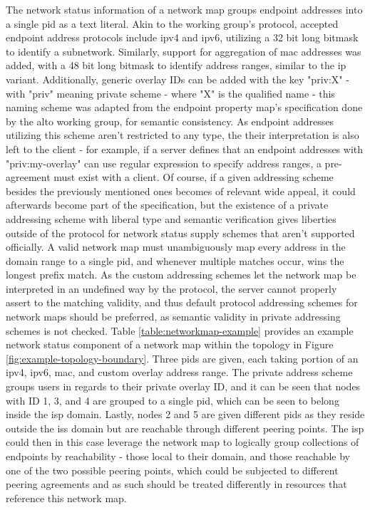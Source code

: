    The network status information of a network map groups endpoint addresses into a single \gls{pid} as a text literal.
    Akin to the working group's protocol, accepted endpoint address protocols include \gls{ipv4} and \gls{ipv6}, utilizing a 32 bit long bitmask to identify a subnetwork.
    Similarly, support for aggregation of \gls{mac} addresses was added, with a 48 bit long bitmask to identify address ranges, similar to the \gls{ip} variant.
    Additionally, generic overlay IDs can be added with the key "priv:X" - with "priv" meaning private scheme - where "X" is the qualified name - this naming scheme was adapted from the endpoint property map's specification done by the \gls{alto} working group, for semantic consistency.
    As endpoint addresses utilizing this scheme aren't restricted to any type, the their interpretation is also left to the client - for example, if a server defines that an endpoint addresses with "priv:my-overlay" can use regular expression to specify address ranges, a pre-agreement must exist with a client.
    Of course, if a given addressing scheme besides the previously mentioned ones becomes of relevant wide appeal, it could afterwards become part of the specification, but the existence of a private addressing scheme with liberal type and semantic verification gives liberties outside of the protocol for network status supply schemes that aren't supported officially.
    A valid network map must unambiguously map every address in the domain range to a single \gls{pid}, and whenever multiple matches occur, wins the longest prefix match.
    As the custom addressing schemes let the network map be interpreted in an undefined way by the protocol, the server cannot properly assert to the matching validity, and thus default protocol addressing schemes for network maps should be preferred, as semantic validity in private addressing schemes is not checked.
    Table \ref{table:networkmap-example} provides an example network status component of a network map within the topology in Figure \ref{fig:example-topology-boundary}.
    Three \glspl{pid} are given, each taking portion of an \gls{ipv4}, \gls{ipv6}, \gls{mac}, and custom overlay address range.
    The private address scheme groups users in regards to their private overlay ID, and it can be seen that nodes with ID 1, 3, and 4 are grouped to a single \gls{pid}, which can be seen to belong inside the \gls{isp} domain.
    Lastly, nodes 2 and 5 are given different \glspl{pid} as they reside outside the \glspl{is} domain but are reachable through different peering points.
    The \gls{isp} could then in this case leverage the network map to logically group collections of endpoints by reachability - those local to their domain, and those reachable by one of the two possible peering points, which could be subjected to different peering agreements and as such should be treated differently in resources that reference this network map.

